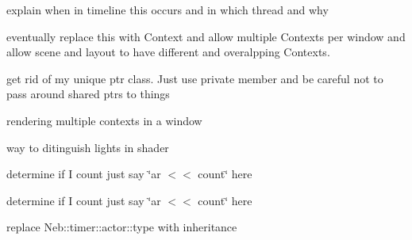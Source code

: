 \begin{DoxyRefList}
\item[\label{todo__todo000009}%
\hypertarget{todo__todo000009}{}%
\-Member \hyperlink{classNeb_1_1Graphics_1_1Camera_1_1View_1_1Base_a90b789b94d88db1e913f3c4933ea41d4}{\-Neb\-:\-:\-Graphics\-:\-:\-Camera\-:\-:\-View\-:\-:\-Base\-:\-:step} (double)=0]explain when in timeline this occurs and in which thread and why  
\item[\label{todo__todo000010}%
\hypertarget{todo__todo000010}{}%
\-Class \hyperlink{classNeb_1_1Graphics_1_1Context_1_1Base}{\-Neb\-:\-:\-Graphics\-:\-:\-Context\-:\-:\-Base} ]eventually replace this with \-Context and allow multiple \-Contexts per window and allow scene and layout to have different and overalpping \-Contexts.  
\item[\label{todo__todo000012}%
\hypertarget{todo__todo000012}{}%
\-Member \hyperlink{classNeb_1_1Graphics_1_1Window_1_1Base_ac71945a8c24260d3427539bdd6c9bc6b}{\-Neb\-:\-:\-Graphics\-:\-:\-Window\-:\-:\-Base\-:\-:\-Base} ()]get rid of my unique ptr class. \-Just use private member and be careful not to pass around shared ptrs to things  
\item[\label{todo__todo000013}%
\hypertarget{todo__todo000013}{}%
\-Member \hyperlink{classNeb_1_1Graphics_1_1Window_1_1Base_adc53fbf523d1dab863f767c5cb534a77}{\-Neb\-:\-:\-Graphics\-:\-:\-Window\-:\-:\-Base\-:\-:render} (double time)]rendering multiple contexts in a window  
\item[\label{todo__todo000011}%
\hypertarget{todo__todo000011}{}%
\-Member \hyperlink{classNeb_1_1Light_1_1Base_ad621061e0be86708f0cbf7e300bc0c1e}{\-Neb\-:\-:\-Light\-:\-:\-Base\-:\-:load} (int, physx\-::\-Px\-Mat44)]way to ditinguish lights in shader  
\item[\label{todo__todo000016}%
\hypertarget{todo__todo000016}{}%
\-Member \hyperlink{structNeb_1_1Message_1_1Actor_1_1IUpdate_aebb6fba27d776081ab4b5a69fc6371c8}{\-Neb\-:\-:\-Message\-:\-:\-Actor\-:\-:\-I\-Update\-:\-:post} ()]determine if \-I count just say \char`\"{}ar $<$$<$ count\char`\"{} here  
\item[\label{todo__todo000015}%
\hypertarget{todo__todo000015}{}%
\-Member \hyperlink{structNeb_1_1Message_1_1Actor_1_1OUpdate_aa972a33a8c8220e7f6194e44c019d817}{\-Neb\-:\-:\-Message\-:\-:\-Actor\-:\-:\-O\-Update\-:\-:post} ()]determine if \-I count just say \char`\"{}ar $<$$<$ count\char`\"{} here  
\item[\label{todo__todo000020}%
\hypertarget{todo__todo000020}{}%
\-Member \hyperlink{classNeb_1_1Scene_1_1Local_a67806ea48d401a114f78de30c14e6eca}{\-Neb\-:\-:\-Scene\-:\-:\-Local\-:\-:fire} (\-Neb\-::\-Actor\-::\-Base\-\_\-s)]replace \-Neb\-::timer\-::actor\-::type with inheritance 
\end{DoxyRefList}